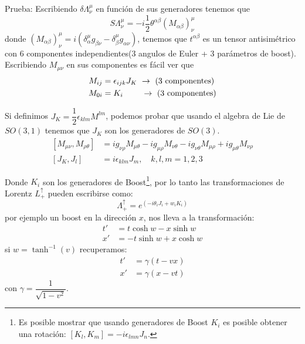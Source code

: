 \documentclass[../main]{subfiles}
\begin{document}
Prueba: Escribiendo $\delta \Lambda^{\mu}_{\nu}$ en función de sus generadores tenemos que
\begin{equation}
    S\Lambda^{\mu}_{\nu}=-i\dfrac{1}{2}\theta^{\alpha\beta}(M_{\alpha\beta})^{\mu}_{\nu}
\end{equation}
donde $(M_{\alpha\beta})^{\mu}_{\nu}=i(\delta^{\mu}_{\alpha}g_{\beta\nu}-\delta^{\mu}_{\beta}g_{\alpha\nu})$, tenemos que $t^{\alpha\beta}$ es un tensor antisimétrico con $6$ componentes independientes($3$ angulos de Euler + $3$ parámetros de boost). Escribiendo $M_{\mu\nu}$ en sus componentes es fácil ver que 
\begin{align*}
    M_{ij}&=\epsilon_{ijk} J_K  \ \rightarrow \  (3 \ \text{componentes})\\
    M_{0i}&=K_i \hspace{0.8cm} \rightarrow \  (3 \ \text{componentes})
\end{align*}

Si definimos $J_K=\dfrac{1}{2}\epsilon_{klm}M^{lm}$, podemos probar que usando el algebra de Lie de $SO(3, 1)$ tenemos que $J_K$ son los generadores de $SO(3)$.
\begin{equation}
    \begin{split}
        [M_{\mu\nu}, M_{\rho\theta}]&=ig_{\nu\rho}M_{\mu\theta}-ig_{\mu\rho}M_{\nu\theta}-ig_{\nu\theta}M_{\mu\rho}+ig_{\mu\theta}M_{\nu\rho}\\
        [J_K, J_l]&=i\epsilon_{klm} J_m,\quad k,l,m=1, 2, 3
    \end{split}
\end{equation}

Donde $K_i$ son los generadores de Boost\footnote{Es posible mostrar que usando generadores de Boost $K_i$ es posible obtener una rotación: $[K_l, K_m]=-i\epsilon_{lmn}J_n$.}, por lo tanto las transformaciones de Lorentz $L^{\uparrow}_{+}$ pueden escribirse como: 
\begin{equation}
    \Lambda^{\uparrow}_{+}=e^{(-i\theta_i J_i+w_i K_i)}
\end{equation}
por ejemplo un boost en la dirección $x$, nos lleva a la transformación:
\begin{equation}
    \begin{split}
        t'&=t\cosh w-x\sinh w\\
        x'&=-t\sinh w+x\cosh w
    \end{split}
\end{equation}
si $w=\tanh^{-1}(v)$ recuperamos:
\begin{equation}
    \begin{split}
        t'&=\gamma(t-vx)\\
        x'&=\gamma(x-vt)
    \end{split}
\end{equation}
con $\gamma=\dfrac{1}{\sqrt{1-v^2}}$.
\end{document}
